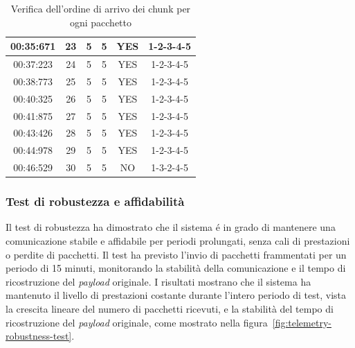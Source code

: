 \documentclass[12pt,a4paper,twoside]{book}
\begin{document}
\begin{table}[H]
{\begin{tabular}{|c|c|c|c|c|c|}
            00:35:671      & 23                            & 5                            & 5                              & YES               & 1-2-3-4-5                 \\ \hline
            00:37:223      & 24                            & 5                            & 5                              & YES               & 1-2-3-4-5                 \\ \hline
            00:38:773      & 25                            & 5                            & 5                              & YES               & 1-2-3-4-5                 \\ \hline
            00:40:325      & 26                            & 5                            & 5                              & YES               & 1-2-3-4-5                 \\ \hline
            00:41:875      & 27                            & 5                            & 5                              & YES               & 1-2-3-4-5                 \\ \hline
            00:43:426      & 28                            & 5                            & 5                              & YES               & 1-2-3-4-5                 \\ \hline
            00:44:978      & 29                            & 5                            & 5                              & YES               & 1-2-3-4-5                 \\ \hline
            00:46:529      & 30                            & 5                            & 5                              & NO                & 1-3-2-4-5                 \\
            \hline
        \end{tabular}
    }
    \caption{Verifica dell'ordine di arrivo dei chunk per ogni pacchetto}
    \label{tab:chunk_order}
\end{table}
\newpage
\subsubsection{Test di robustezza e affidabilità}
Il test di robustezza ha dimostrato che il sistema \'e in grado di mantenere una comunicazione
stabile e affidabile per periodi prolungati, senza cali di prestazioni o perdite di pacchetti.
Il test ha previsto l'invio di pacchetti frammentati per un periodo di 15 minuti,
monitorando la stabilità della comunicazione e il tempo di ricostruzione del \emph{payload} originale.
I risultati mostrano che il sistema ha mantenuto il livello di prestazioni costante durante
l'intero periodo di test, vista la crescita lineare del numero di pacchetti ricevuti,
e la stabilità del tempo di ricostruzione del \emph{payload} originale, come
mostrato nella figura~\ref{fig:telemetry-robustness-test}.
\end{document}
